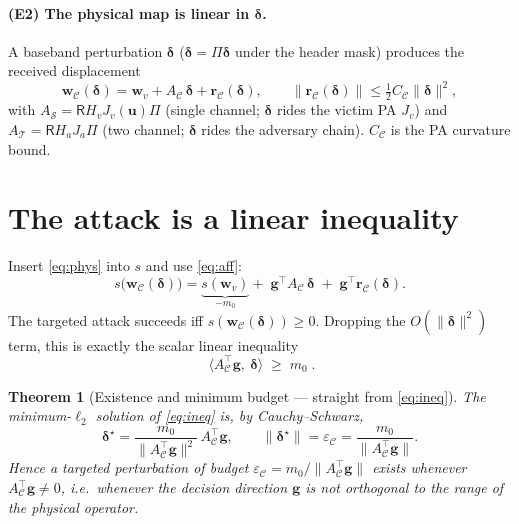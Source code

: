 \documentclass[11pt]{article}
\newtheorem{theorem}{Theorem}\newtheorem{corollary}[theorem]{Corollary}
\newcommand{\norm}[1]{\lVert #1\rVert}\newcommand{\Rx}{\mathsf{R}}
\newcommand{\bu}{\bm u}\newcommand{\bw}{\bm w}\newcommand{\bd}{\bm\delta}\newcommand{\bg}{\bm g}
\begin{document}
\paragraph{(E2) The physical map is linear in $\bd$.} A baseband perturbation $\bd$
($\bd=\Pi\bd$ under the header mask) produces the received displacement
\begin{equation}\label{eq:phys}
  \bw_{\mathcal C}(\bd)=\bw_v+A_{\mathcal C}\,\bd+\bm r_{\mathcal C}(\bd),\qquad
  \norm{\bm r_{\mathcal C}(\bd)}\le\tfrac12 C_{\mathcal C}\norm{\bd}^2,
\end{equation}
with $A_{\mathcal S}=\Rx H_v J_v(\bu)\Pi$ (single channel; $\bd$ rides the victim PA $J_v$) and
$A_{\mathcal T}=\Rx H_a J_a\Pi$ (two channel; $\bd$ rides the adversary chain). $C_{\mathcal C}$
is the PA curvature bound.

\section{The attack is a linear inequality}

Insert \eqref{eq:phys} into $s$ and use \eqref{eq:aff}:
\begin{equation}\label{eq:score}
  s\big(\bw_{\mathcal C}(\bd)\big)=\underbrace{s(\bw_v)}_{-m_0}
     +\;\bg^\top A_{\mathcal C}\,\bd\;+\;\bg^\top\bm r_{\mathcal C}(\bd).
\end{equation}
The targeted attack succeeds iff $s(\bw_{\mathcal C}(\bd))\ge 0$. Dropping the $O(\norm{\bd}^2)$
term, this is exactly the scalar linear inequality
\begin{equation}\label{eq:ineq}
  \boxed{\;\big\langle A_{\mathcal C}^\top\bg,\ \bd\big\rangle\;\ge\;m_0\;}.
\end{equation}

\begin{theorem}[Existence and minimum budget --- straight from \eqref{eq:ineq}]\label{thm:exist}
The minimum-$\ell_2$ solution of \eqref{eq:ineq} is, by Cauchy--Schwarz,
\begin{equation}\label{eq:sol}
  \bd^\star=\frac{m_0}{\norm{A_{\mathcal C}^\top\bg}^2}\,A_{\mathcal C}^\top\bg,
  \qquad
  \norm{\bd^\star}=\varepsilon_{\mathcal C}=\frac{m_0}{\norm{A_{\mathcal C}^\top\bg}} .
\end{equation}
Hence a targeted perturbation of budget $\varepsilon_{\mathcal C}=m_0/\norm{A_{\mathcal C}^\top\bg}$
exists whenever $A_{\mathcal C}^\top\bg\neq0$, i.e.\ whenever the decision direction $\bg$ is not
orthogonal to the range of the physical operator.
\end{theorem}
\end{document}
